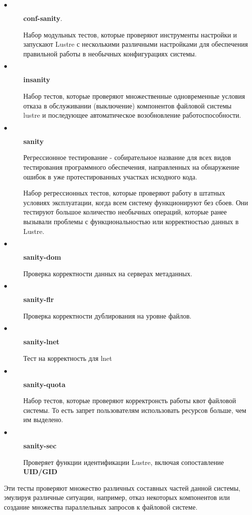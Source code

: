 \begin{description}
    \item[$\bullet$] \textbf{conf-sanity}.
    
    Набор модульных тестов, которые проверяют инструменты настройки и запускают Lustre с несколькими
    различными настройками для обеспечения правильной работы в необычных конфигурациях системы.
    \item[$\bullet$] \textbf{insanity}
    
    Набор тестов, которые проверяют множественные одновременные условия отказа в обслуживании (выключение) компонентов файловой системы lustre и последующее автоматическое возобновление работоспособности.
    \item[$\bullet$] \textbf{sanity}
    
    Регрессионное тестирование - собирательное название для всех видов тестирования программного обеспечения, направленных на обнаружение ошибок в уже протестированных участках исходного кода. 
    
    Набор регрессионных тестов, которые проверяют работу в штатных условиях эксплуатации, когда всем систему функционируют без сбоев. Они тестируют большое количество необычных операций, которые ранее вызывали проблемы с функциональностью или корректностью данных в Lustre.
    
    \item[$\bullet$] \textbf{sanity-dom}
    
    Проверка корректности данных на серверах метаданных.
    \item[$\bullet$] \textbf{sanity-flr}
    
    Проверка корректности дублирования на уровне файлов.
    \item[$\bullet$] \textbf{sanity-lnet}
    
    Тест на корректность для lnet
    \item[$\bullet$] \textbf{sanity-quota}
    
    Набор тестов, которые проверяют корректронсть работы квот файловой системы. То есть запрет пользователям использовать ресурсов больше, чем им выделено.
    \item[$\bullet$] \textbf{sanity-sec}
    
    Проверяет функции идентификации Lustre, включая сопоставление \textbf{UID/GID}
\end{description}

Эти тесты проверяют множество различных составных частей данной системы, эмулируя
различные ситуации, например, отказ некоторых компонентов или создание множества
параллельных запросов к файловой системе.

